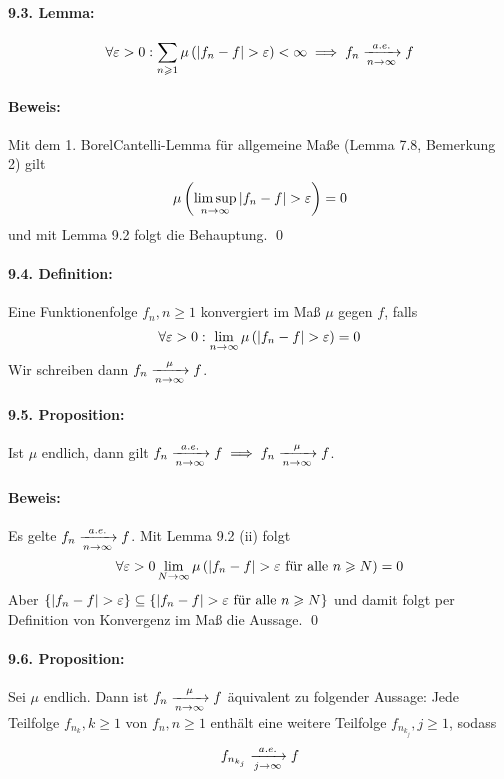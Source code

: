 \documentclass[11pt]{report}
\begin{document}
\paragraph{9.3. Lemma:}
$$\forall\eps>0:\sum_{n\geq1}\mu\left(|f_n-f|>\eps\right)<\infty\implies f_n\nto{a.e.}{n\to\infty}f$$

\paragraph{Beweis:}Mit dem 1. Borel\textendash Cantelli-Lemma f\"ur allgemeine Ma\ss{}e (Lemma 7.8, Bemerkung 2) gilt 
$$\mu\left(\limsup_{n\to\infty}{|f_n-f|>\eps}\right)=0$$
und mit Lemma 9.2 folgt die Behauptung. \qed

\paragraph{9.4. Definition:}Eine Funktionenfolge $f_n,n\geq1$ konvergiert im Ma\ss{} $\mu$ gegen $f$, falls
$$\forall\eps>0:\lim_{n\to\infty}\mu\left(|f_n-f|>\eps\right)=0$$
Wir schreiben dann $f_n\nto{\mu}{n\to\infty}f$.

\paragraph{9.5. Proposition:}Ist $\mu$ endlich, dann gilt $f_n\nto{a.e.}{n\to\infty}f\implies f_n\nto{\mu}{n\to\infty}f$.

\paragraph{Beweis:}Es gelte $f_n\nto{a.e.}{n\to\infty}f$. Mit Lemma 9.2 (ii) folgt
$$\forall\eps>0\lim_{N\to\infty}\mu\left(|f_n-f|>\eps\text{ f\"ur alle }n\geq N\right)=0$$
Aber $\{|f_n-f|>\eps\}\subseteq \left\{|f_n-f|>\eps\text{ f\"ur alle }n\geq N\right\}$
und damit folgt per Definition von Konvergenz im Ma\ss{} die Aussage. \qed

\paragraph{9.6. Proposition:} Sei $\mu$ endlich. Dann ist $f_n\nto{\mu}{n\to\infty}f$ \"aquivalent zu folgender Aussage:\newline
Jede Teilfolge $f_{n_k},k\geq1$ von $f_n,n\geq1$ enth\"alt eine weitere Teilfolge $f_{n_{k_j}},j\geq1$, sodass 
$$f_{n_{k_j}}\nto{a.e.}{j\to\infty}f$$
\end{document}
